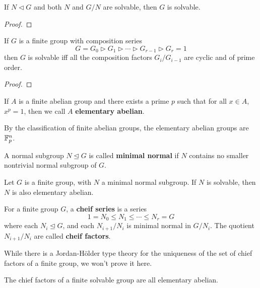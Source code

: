 \documentclass{article}
\begin{document}
\begin{lemma}
    If $N\lhd G$ and both $N$ and $G/N$ are solvable, then $G$ is solvable.
    \begin{proof}
        
    \end{proof}
\end{lemma}

\begin{proposition}
    If $G$ is a finite group with composition series \[
    G = G_0 \rhd  G_1 \rhd \cdots \rhd G_{r-1} \rhd G_r = 1
    \] then $G$ is solvable iff all the composition factors $G_i/G_{i-1}$ are cyclic and of prime order.
    \begin{proof}
        
    \end{proof}
\end{proposition}

\begin{definition}
    If $A$ is a finite abelian group and there exists a prime $p$ such that for all $x\in A$, $x^p=1$, then we call $A$ \textbf{elementary abelian}.
\end{definition}

By the classification of finite abelian groups, the elementary abelian groups are $\mathbb{F}_p^n$.

\begin{definition}
    A normal subgroup $N\unlhd G$ is called \textbf{minimal normal} if $N$ contains no smaller nontrivial normal subgroup of $G$.
\end{definition}

\begin{proposition}
    Let $G$ is a finite group, with $N$ a minimal normal subgroup. If $N$ is solvable, then $N$ is also elementary abelian.
\end{proposition}

\begin{definition}
    For a finite group $G$, a \textbf{cheif series} is a series \[
    1 = N_0 \leq N_1 \leq \cdots \leq N_r = G
    \] where each $N_i\unlhd G$, and each $N_{i+1}/N_i$ is minimal normal in $G/N_i$. The quotient $N_{i+1}/N_i$ are called \textbf{cheif factors}.
\end{definition}

While there is a Jordan-H\"older type theory for the uniqueness of the set of chief factors of a finite group, we won't prove it here.

\begin{corollary}
    The chief factors of a finite solvable group are all elementary abelian.
\end{corollary}
\end{document}
